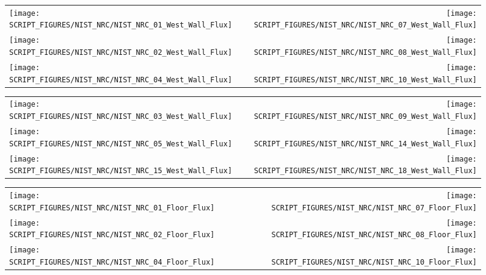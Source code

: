 \begin{figure}[p]
\begin{tabular*}{\textwidth}{l@{\extracolsep{\fill}}r}
\texttt{[image: SCRIPT\_FIGURES/NIST\_NRC/NIST\_NRC\_01\_West\_Wall\_Flux]} &
\texttt{[image: SCRIPT\_FIGURES/NIST\_NRC/NIST\_NRC\_07\_West\_Wall\_Flux]} \\
\texttt{[image: SCRIPT\_FIGURES/NIST\_NRC/NIST\_NRC\_02\_West\_Wall\_Flux]} &
\texttt{[image: SCRIPT\_FIGURES/NIST\_NRC/NIST\_NRC\_08\_West\_Wall\_Flux]} \\
\texttt{[image: SCRIPT\_FIGURES/NIST\_NRC/NIST\_NRC\_04\_West\_Wall\_Flux]} &
\texttt{[image: SCRIPT\_FIGURES/NIST\_NRC/NIST\_NRC\_10\_West\_Wall\_Flux]}
\end{tabular*}
\label{NIST_NRC_West_Wall_Flux_Closed}
\end{figure}

\begin{figure}[p]
\begin{tabular*}{\textwidth}{l@{\extracolsep{\fill}}r}
\texttt{[image: SCRIPT\_FIGURES/NIST\_NRC/NIST\_NRC\_03\_West\_Wall\_Flux]} &
\texttt{[image: SCRIPT\_FIGURES/NIST\_NRC/NIST\_NRC\_09\_West\_Wall\_Flux]} \\
\texttt{[image: SCRIPT\_FIGURES/NIST\_NRC/NIST\_NRC\_05\_West\_Wall\_Flux]} &
\texttt{[image: SCRIPT\_FIGURES/NIST\_NRC/NIST\_NRC\_14\_West\_Wall\_Flux]} \\
\texttt{[image: SCRIPT\_FIGURES/NIST\_NRC/NIST\_NRC\_15\_West\_Wall\_Flux]} &
\texttt{[image: SCRIPT\_FIGURES/NIST\_NRC/NIST\_NRC\_18\_West\_Wall\_Flux]}
\end{tabular*}
\label{NIST_NRC_West_Wall_Flux_Open}
\end{figure}

\begin{figure}[p]
\begin{tabular*}{\textwidth}{l@{\extracolsep{\fill}}r}
\texttt{[image: SCRIPT\_FIGURES/NIST\_NRC/NIST\_NRC\_01\_Floor\_Flux]} &
\texttt{[image: SCRIPT\_FIGURES/NIST\_NRC/NIST\_NRC\_07\_Floor\_Flux]} \\
\texttt{[image: SCRIPT\_FIGURES/NIST\_NRC/NIST\_NRC\_02\_Floor\_Flux]} &
\texttt{[image: SCRIPT\_FIGURES/NIST\_NRC/NIST\_NRC\_08\_Floor\_Flux]} \\
\texttt{[image: SCRIPT\_FIGURES/NIST\_NRC/NIST\_NRC\_04\_Floor\_Flux]} &
\texttt{[image: SCRIPT\_FIGURES/NIST\_NRC/NIST\_NRC\_10\_Floor\_Flux]}
\end{tabular*}
\label{NIST_NRC_Floor_Flux_Closed}
\end{figure}

